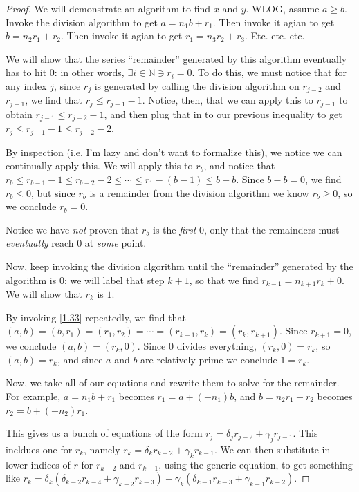 \documentclass{article}
\numberwithin{equation}{thm}
\begin{document}
\begin{proof}
  We will demonstrate an algorithm to find $x$ and $y$. WLOG, assume $a \geq b$. Invoke the division algorithm to get $a = n_1 b + r_1$. Then invoke it agian to get $b = n_2 r_1 + r_2$. Then invoke it agian to get $r_1 = n_3 r_2 + r_3$. Etc. etc. etc.

  We will show that the series ``remainder'' generated by this algorithm eventually has to hit $0$: in other words, $\exists i \in \mathbb{N} \ni r_i = 0$. To do this, we must notice that for any index $j$, since $r_j$ is generated by calling the division algorithm on $r_{j-2}$ and $r_{j-1}$, we find that $r_j \leq r_{j-1}-1$.
  Notice, then, that we can apply this to $r_{j-1}$ to obtain $r_{j-1} \leq r_{j-2} - 1$, and then plug that in to our previous inequality to get $r_{j} \leq r_{j-1} - 1 \leq r_{j-2} - 2$.

  By inspection (i.e. I'm lazy and don't want to formalize this), we notice we can continually apply this. We will apply this to $r_b$, and notice that $r_b \leq r_{b-1} - 1 \leq r_{b-2} - 2 \leq \cdots \leq r_{1} - (b - 1) \leq b - b$. Since $b-b = 0$, we find $r_b \leq 0$, but since $r_b$ is a remainder from the division algorithm we know $r_b \geq 0$, so we conclude $r_b = 0$.

  Notice we have \emph{not} proven that $r_b$ is the \emph{first} $0$, only that the remainders must \emph{eventually} reach $0$ at \emph{some} point.

  Now, keep invoking the division algorithm until the ``remainder'' generated by the algorithm is $0$: we will label that step $k+1$, so that we find $r_{k-1} = n_{k+1} r_k + 0$. We will show that $r_k$ is $1$.

  By invoking \ref{1.33} repeatedly, we find that $(a, b) = (b, r_1) = (r_1, r_2) = \cdots = (r_{k-1}, r_k) = (r_k, r_{k+1})$. Since $r_{k+1} = 0$, we conclude $(a, b) = (r_k, 0)$. Since $0$ divides everything, $(r_k, 0) = r_k$, so $(a, b) = r_k$, and since $a$ and $b$ are relatively prime we conclude $1 = r_k$.

  Now, we take all of our equations and rewrite them to solve for the remainder. For example, $a = n_1 b + r_1$ becomes $r_1 = a + (-n_1) b$, and $b = n_2 r_1 + r_2$ becomes $r_2 = b + (-n_2) r_1$.

  This gives us a bunch of equations of the form $r_j = \delta_{j} r_{j-2} + \gamma_{j} r_{j-1}$. This incldues one for $r_k$, namely $r_k = \delta_k r_{k-2} + \gamma_k r_{k-1}$.
  We can then substitute in lower indices of $r$ for $r_{k-2}$ and $r_{k-1}$, using the generic equation, to get something like $r_k = \delta_k (\delta_{k-2} r_{k-4} + \gamma_{k-2} r_{k-3}) + \gamma_k (\delta_{k-1} r_{k-3} + \gamma_{k-1} r_{k-2})$.


\end{proof}
\end{document}

